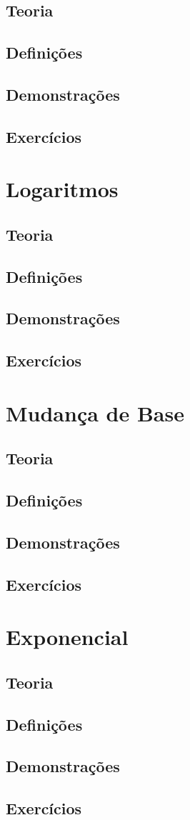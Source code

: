 \documentclass[portuguese, 12pt, a4paper]{article}
\begin{document}
	\subsection{Teoria}
	\subsection{Definições}
	\subsection{Demonstrações}
	\subsection{Exercícios}
	
	\section{Logaritmos}
	\subsection{Teoria}
	\subsection{Definições}
	\subsection{Demonstrações}
	\subsection{Exercícios}
	
	\section{Mudança de Base}
	\subsection{Teoria}
	\subsection{Definições}
	\subsection{Demonstrações}
	\subsection{Exercícios}
	
	\section{Exponencial}
	\subsection{Teoria}
	\subsection{Definições}
	\subsection{Demonstrações}
	\subsection{Exercícios}
	
\end{document}
